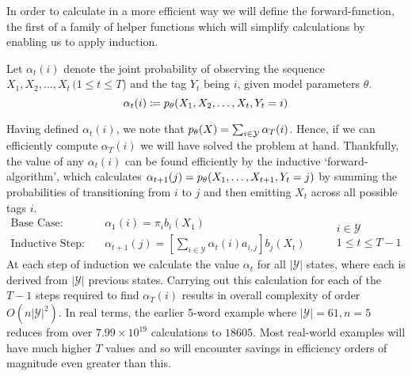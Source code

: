 \documentclass[../main.tex]{subfiles}
\begin{document}
In order to calculate in a more efficient way we will define the forward-function, the first of a family of helper functions which will simplify calculations by enabling us to apply induction.
\begin{definition} \label{def:forward-func}
    Let $\alpha_t(i)$ denote the joint probability of observing the sequence $X_1, X_2, \ldots, X_t \, (1 \leq t \leq T$) and the tag $Y_t$ being $i$, given model parameters $\theta$.
    \begin{equation*}
        \alpha_t(i) \coloneqq p_\theta(X_1,X_2,\ldots,X_t,Y_t=i)
    \end{equation*}
\end{definition}
Having defined $\alpha_t(i)$, we note that $p_\theta(X) = \sum_{i \in \mathcal{Y}} \alpha_T(i)$.
Hence, if we can efficiently compute $\alpha_T(i)$ we will have solved the problem at hand.
Thankfully, the value of any $\alpha_t(i)$ can be found efficiently by the inductive `forward-algorithm', which calculates $\alpha_{t+1}(j) = p_\theta(X_1,\ldots,X_{t+1},Y_t=j)$ by summing the probabilities of transitioning from $i$ to $j$ and then emitting $X_{t}$ across all possible tags $i$.
\begin{equation*}
    \begin{aligned}
        \text{Base Case:} & \quad \alpha_1(i) = \pi_{i} b_i(X_1) \\
        \text{Inductive Step:} & \quad \alpha_{t+1}(j) = \left[ \sum_{i \in \mathcal{Y}} \alpha_{t}(i)a_{i,j} \right] b_j(X_t)
    \end{aligned} \qquad 
        \begin{array}{lr}
            i \in \mathcal{Y} \\
            1 \leq t \leq T-1
        \end{array}
\end{equation*}
At each step of induction we calculate the value $\alpha_t$ for all $|\mathcal{Y}|$ states, where each is derived from $|\mathcal{Y}|$ previous states.
Carrying out this calculation for each of the $T-1$ steps required to find $\alpha_T(i)$ results in overall complexity of order $O(n|\mathcal{Y}|^2)$.
In real terms, the earlier 5-word example where $|\mathcal{Y}|=61,n=5$ reduces from over $7.99 \times 10^{19}$ calculations to $18605$. Most real-world examples will have much higher $T$ values and so will encounter savings in efficiency orders of magnitude even greater than this.
\end{document}
